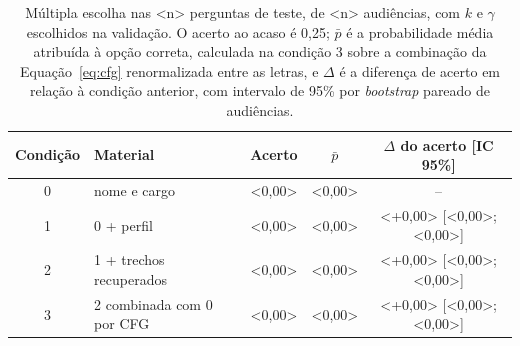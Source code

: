 \begin{table}[!htb]
  \centering
  \caption{Múltipla escolha nas <n> perguntas de teste, de <n> audiências, com $k$ e $\gamma$
  escolhidos na validação. O acerto ao acaso é 0,25; $\bar{p}$ é a probabilidade média atribuída à
  opção correta, calculada na condição 3 sobre a combinação da Equação~\ref{eq:cfg} renormalizada
  entre as letras, e $\Delta$ é a diferença de acerto em relação à condição anterior, com intervalo de
  95\% por \textit{bootstrap} pareado de audiências.}
  \label{tab:resultados}
  \small
  \begin{tabular*}{\textwidth}{@{\extracolsep{\fill}}clccc@{}}
    \toprule
    \textbf{Condição} & \textbf{Material} & \textbf{Acerto} & $\bar{p}$ & $\Delta$ \textbf{do acerto [IC 95\%]} \\
    \midrule
    0 & nome e cargo                   & <0,00> & <0,00> & -- \\
    1 & 0 + perfil                     & <0,00> & <0,00> & <+0,00> [<0,00>; <0,00>] \\
    2 & 1 + trechos recuperados        & <0,00> & <0,00> & <+0,00> [<0,00>; <0,00>] \\
    3 & 2 combinada com 0 por CFG      & <0,00> & <0,00> & <+0,00> [<0,00>; <0,00>] \\
    \bottomrule
  \end{tabular*}
\end{table}

